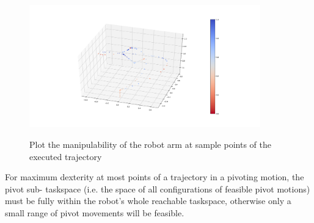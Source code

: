 \begin{center}
\begin{figure}[H]
\centering
\includegraphics[width=10cm]{images/robot-planner1-manipulability-plot.png}\\
\caption{Plot the manipulability of the robot arm at sample points of the executed trajectory}
\end{figure}
\end{center}

For maximum dexterity at most points of a trajectory in a pivoting motion, the pivot sub-
taskspace (i.e. the space of all configurations of feasible pivot motions) must be fully within 
the robot’s whole reachable taskspace, otherwise only a small range of pivot movements will be 
feasible.